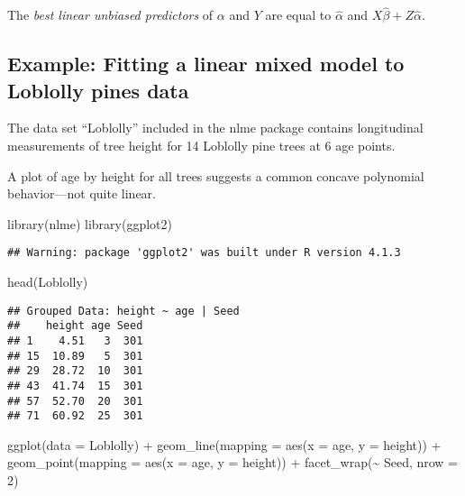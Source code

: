 \documentclass[
]{book}
\newenvironment{Shaded}{\begin{snugshade}}{\end{snugshade}}
\newcommand{\AttributeTok}[1]{\textcolor[rgb]{0.77,0.63,0.00}{#1}}
\newcommand{\DecValTok}[1]{\textcolor[rgb]{0.00,0.00,0.81}{#1}}
\newcommand{\FunctionTok}[1]{\textcolor[rgb]{0.00,0.00,0.00}{#1}}
\newcommand{\NormalTok}[1]{#1}
\newcommand{\SpecialCharTok}[1]{\textcolor[rgb]{0.00,0.00,0.00}{#1}}
\begin{document}
The \emph{best linear unbiased predictors} of \(\alpha\) and \(Y\) are equal to \(\hat\alpha\) and \(X\hat\beta + Z\hat\alpha\).

\hypertarget{example-fitting-a-linear-mixed-model-to-loblolly-pines-data}{%
\subsection{Example: Fitting a linear mixed model to Loblolly pines data}\label{example-fitting-a-linear-mixed-model-to-loblolly-pines-data}}

The data set ``Loblolly'' included in the nlme package contains longitudinal measurements of tree height for 14 Loblolly pine trees at 6 age points.

A plot of age by height for all trees suggests a common concave polynomial behavior---not quite linear.

\begin{Shaded}
\begin{Highlighting}[]
\FunctionTok{library}\NormalTok{(nlme)}
\FunctionTok{library}\NormalTok{(ggplot2)}
\end{Highlighting}
\end{Shaded}

\begin{verbatim}
## Warning: package 'ggplot2' was built under R version 4.1.3
\end{verbatim}

\begin{Shaded}
\begin{Highlighting}[]
\FunctionTok{head}\NormalTok{(Loblolly)}
\end{Highlighting}
\end{Shaded}

\begin{verbatim}
## Grouped Data: height ~ age | Seed
##    height age Seed
## 1    4.51   3  301
## 15  10.89   5  301
## 29  28.72  10  301
## 43  41.74  15  301
## 57  52.70  20  301
## 71  60.92  25  301
\end{verbatim}

\begin{Shaded}
\begin{Highlighting}[]
\FunctionTok{ggplot}\NormalTok{(}\AttributeTok{data =}\NormalTok{ Loblolly) }\SpecialCharTok{+} 
  \FunctionTok{geom\_line}\NormalTok{(}\AttributeTok{mapping =} \FunctionTok{aes}\NormalTok{(}\AttributeTok{x =}\NormalTok{ age, }\AttributeTok{y =}\NormalTok{ height)) }\SpecialCharTok{+} 
  \FunctionTok{geom\_point}\NormalTok{(}\AttributeTok{mapping =} \FunctionTok{aes}\NormalTok{(}\AttributeTok{x =}\NormalTok{ age, }\AttributeTok{y =}\NormalTok{ height)) }\SpecialCharTok{+} 
  \FunctionTok{facet\_wrap}\NormalTok{(}\SpecialCharTok{\textasciitilde{}}\NormalTok{ Seed, }\AttributeTok{nrow =} \DecValTok{2}\NormalTok{)}
\end{Highlighting}
\end{Shaded}
\end{document}
